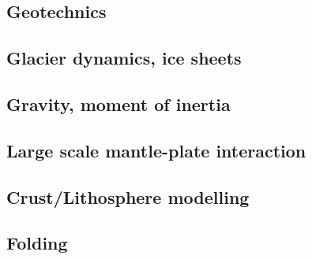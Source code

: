 \subsection*{Geotechnics}

\cite{zhll03}

\subsection*{Glacier dynamics, ice sheets}

\cite{asbl06}
\cite{zhjg11}
\cite{lejx14}
\cite{issg15}

\subsection*{Gravity, moment of inertia}

\cite{rola77}
\cite{zhou08}

\subsection*{Large scale mantle-plate interaction}

\cite{algs12}

\subsection*{Crust/Lithosphere modelling}

\cite{daco88}
\cite{nefo93}
\cite{lecd98}
\cite{hanl00}\cite{labp00}
\cite{homo01}
\cite{labu02}
\cite{hagu05}
\cite{libi06}
\cite{afrf07}
\cite{affr08}
\cite{hapo08}
\cite{hamo10}
\cite{rera11}
\cite{kava14}\cite{dusp14}\cite{rugb14}
\cite{rugb17}
\cite{koen19}

\subsection*{Folding}

\cite{ramb68}
\cite{ramb70}
\cite{ramb71}
\cite{reds12}
\cite{regc13}

